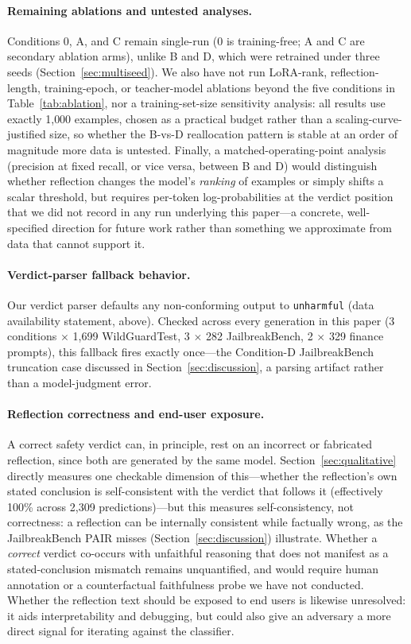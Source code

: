 \documentclass[superintelligence,article,submit,pdftex,moreauthors]{Definitions/mdpi}
\begin{document}
\paragraph{Remaining ablations and untested analyses.}
Conditions 0, A, and C remain single-run (0 is training-free; A and C are secondary ablation arms), unlike B and D, which were retrained under three seeds (Section~\ref{sec:multiseed}). We also have not run LoRA-rank, reflection-length, training-epoch, or teacher-model ablations beyond the five conditions in Table~\ref{tab:ablation}, nor a training-set-size sensitivity analysis: all results use exactly 1{,}000 examples, chosen as a practical budget rather than a scaling-curve-justified size, so whether the B-vs-D reallocation pattern is stable at an order of magnitude more data is untested. Finally, a matched-operating-point analysis (precision at fixed recall, or vice versa, between B and D) would distinguish whether reflection changes the model's \emph{ranking} of examples or simply shifts a scalar threshold, but requires per-token log-probabilities at the verdict position that we did not record in any run underlying this paper---a concrete, well-specified direction for future work rather than something we approximate from data that cannot support it.

\paragraph{Verdict-parser fallback behavior.}
Our verdict parser defaults any non-conforming output to \texttt{unharmful} (data availability statement, above). Checked across every generation in this paper (3 conditions $\times$ 1{,}699 WildGuardTest, 3 $\times$ 282 JailbreakBench, 2 $\times$ 329 finance prompts), this fallback fires exactly once---the Condition-D JailbreakBench truncation case discussed in Section~\ref{sec:discussion}, a parsing artifact rather than a model-judgment error.

\paragraph{Reflection correctness and end-user exposure.}
A correct safety verdict can, in principle, rest on an incorrect or fabricated reflection, since both are generated by the same model. Section~\ref{sec:qualitative} directly measures one checkable dimension of this---whether the reflection's own stated conclusion is self-consistent with the verdict that follows it (effectively 100\% across 2{,}309 predictions)---but this measures self-consistency, not correctness: a reflection can be internally consistent while factually wrong, as the JailbreakBench PAIR misses (Section~\ref{sec:discussion}) illustrate. Whether a \emph{correct} verdict co-occurs with unfaithful reasoning that does not manifest as a stated-conclusion mismatch remains unquantified, and would require human annotation or a counterfactual faithfulness probe we have not conducted. Whether the reflection text should be exposed to end users is likewise unresolved: it aids interpretability and debugging, but could also give an adversary a more direct signal for iterating against the classifier.
\end{document}
